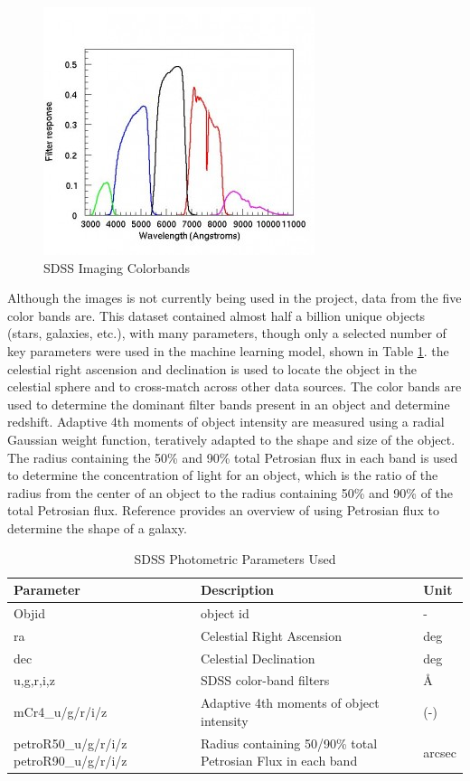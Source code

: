 \documentclass[11pt,sigconf]{acmart}
\begin{document}
\begin{figure}[htbp]
  \centering
  \includegraphics[scale=0.5]{camera_filters-300x274}
  \caption{SDSS Imaging Colorbands \cite{sdss_imaging}}
  \label{fig:colorbands}
\end{figure}

Although the images is not currently being used in the project, data from the five 
color bands are. This dataset contained almost half a billion unique 
objects (stars, galaxies, etc.), with many parameters, though only a selected 
number of key parameters were used in the machine learning model, shown in 
Table \ref{tab:table_IMAGE}. the celestial right ascension and declination is used to 
locate the object in the celestial sphere and to cross-match across other data sources. 
The color bands are used to determine the dominant filter bands present in an object and 
determine redshift. Adaptive 4th moments of object intensity are measured using a radial 
Gaussian weight function, teratively adapted to the shape and size of the object. The 
radius containing the 50\% and 90\% total Petrosian flux in each band is used to 
determine the concentration of light for an object, which is the ratio of the radius 
from the center of an object to the radius containing 50\% and 90\% of the total 
Petrosian flux. Reference \cite{galaxy_photometry} provides an overview of using 
Petrosian flux to determine the shape of a galaxy.

\begin{table}[]
  \begin{tabular}{ |p{3.0cm}|p{3.2cm}|p{1.0cm}|  } \hline
   \textbf{Parameter} & \textbf{Description} & \textbf{Unit}  \\ \hline
   Objid & object id  & - \\ \hline
   ra & Celestial Right Ascension & deg \\ \hline
   dec & Celestial Declination & deg \\ \hline
   u,g,r,i,z & SDSS color-band filters & \AA \\ \hline
   mCr4\_u/g/r/i/z & Adaptive 4th moments of object intensity & (-) \\ \hline
   petroR50\_u/g/r/i/z petroR90\_u/g/r/i/z & Radius containing 50/90\% total Petrosian Flux in each band & arcsec \\ \hline
  \end{tabular}
  \caption{\label{tab:table_IMAGE}SDSS Photometric Parameters Used}
  \end{table}
\end{document}
